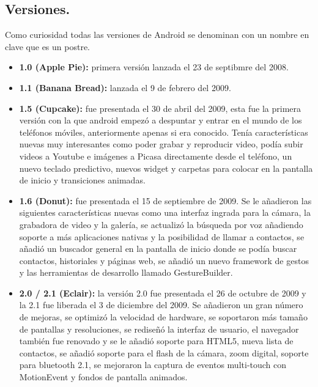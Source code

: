 \subsection{Versiones.}

Como curiosidad todas las versiones de Android se denominan con un nombre en clave que es un postre.
\begin{itemize}

	\item \textbf{1.0 (Apple Pie):} primera versión lanzada el 23 de septibmre del 2008.
	
	\item \textbf{1.1 (Banana Bread):} lanzada el 9 de febrero del 2009.
	
	\item \textbf{1.5 (Cupcake):} fue presentada el 30 de abril del 2009, esta fue la primera versión con la que android empezó a despuntar y entrar en el mundo de los teléfonos móviles, anteriormente apenas si era conocido. Tenía características nuevas muy interesantes como poder grabar y reproducir video, podía subir videos a Youtube e imágenes a Picasa directamente desde el teléfono, un nuevo teclado predictivo, nuevos widget y carpetas para colocar en la pantalla de inicio y transiciones animadas.

	\item \textbf{1.6 (Donut):} fue presentada el 15 de septiembre de 2009. Se le añadieron las siguientes características nuevas como una interfaz ingrada para la cámara, la grabadora de video y la galería, se actualizó la búsqueda por voz añadiendo soporte a más aplicaciones nativas y la posibilidad de llamar a contactos, se añadió un buscador general en la pantalla de inicio donde se podía buscar contactos, historiales y páginas web, se añadió un nuevo framework de gestos y las herramientas de desarrollo llamado GestureBuilder.

	\item \textbf{2.0 / 2.1 (Eclair):} la versión 2.0 fue presentada el 26 de octubre de 2009 y la 2.1 fue liberada el 3 de diciembre del 2009. Se añadieron un gran número de mejoras, se optimizó la velocidad de hardware, se soportaron más tamaño de pantallas y resoluciones, se rediseñó la interfaz de usuario, el navegador también fue renovado y se le añadió soporte para HTML5, nueva lista de contactos, se añadió soporte para el flash de la cámara, zoom digital, soporte para bluetooth 2.1, se mejoraron la captura de eventos multi-touch con MotionEvent y fondos de pantalla animados.
	

\end{itemize}
